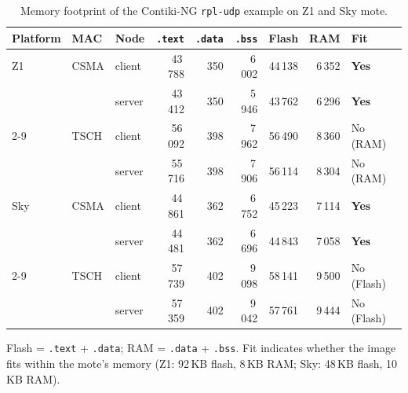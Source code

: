 \begin{table}[htbp]
    \centering
    \renewcommand{\arraystretch}{1.3}
    \caption{Memory footprint of the Contiki-NG \texttt{rpl-udp}
    example on Z1 and Sky mote.}
    \label{tab:footprint-nbr10}
    \begin{tabular}{lllrrrrrl}
        \hline
        Platform & MAC & Node & \texttt{.text} & \texttt{.data}
        & \texttt{.bss} & Flash & RAM & Fit \\
        \hline
        Z1  & CSMA & client & 43\,788 & 350 & 6\,002 & 44\,138 & 6\,352 &
        \textbf{Yes} \\
        &      & server & 43\,412 & 350 & 5\,946 & 43\,762 & 6\,296 &
        \textbf{Yes}
        \\
        \cline{2-9}
        & TSCH & client & 56\,092 & 398 & 7\,962 & 56\,490
        & 8\,360 & No (RAM) \\
        &      & server & 55\,716 & 398 & 7\,906 & 56\,114
        & 8\,304 & No (RAM) \\
        \hline
        Sky & CSMA & client & 44\,861 & 362 & 6\,752 & 45\,223 & 7\,114 &
        \textbf{Yes} \\
        &      & server & 44\,481 & 362 & 6\,696 & 44\,843 & 7\,058 &
        \textbf{Yes}
        \\
        \cline{2-9}
        & TSCH & client & 57\,739 & 402 & 9\,098
        & 58\,141 & 9\,500 & No (Flash) \\
        &      & server & 57\,359 & 402 & 9\,042
        & 57\,761 & 9\,444 & No (Flash) \\
        \hline
    \end{tabular}

    \smallskip
    \footnotesize{Flash = \texttt{.text} + \texttt{.data}; RAM =
        \texttt{.data} + \texttt{.bss}. Fit indicates whether the
        image fits within the mote's memory (Z1: 92\,KB flash,
    8\,KB RAM; Sky: 48\,KB flash, 10\,KB RAM).}
\end{table}
